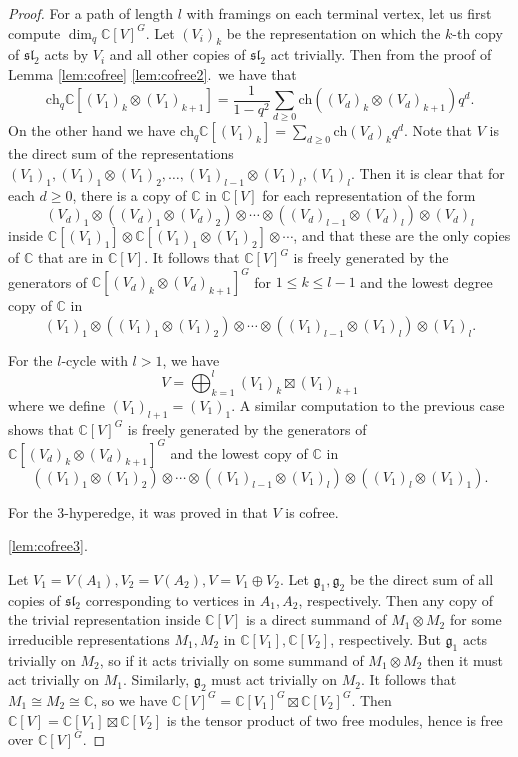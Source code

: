 \documentclass[12pt]{article}
\newcommand{\C}{\mathbb{C}}
\renewcommand{\sl}{\mathfrak{sl}}
\theoremstyle{definition}
\theoremstyle{remark}
\newcommand{\g}{\mathfrak{g}}
\newcommand{\ch}{\mathrm{ch}}
\begin{document}
\begin{proof}
For a path of length $l$ with framings on each terminal vertex, let us first compute $\dim_q\C[V]^G$. Let $(V_i)_k$ be the representation on which the $k$-th copy of $\sl_2$ acts by $V_i$ and all other copies of $\sl_2$ act trivially. Then from the proof of Lemma \ref{lem:cofree} \ref{lem:cofree2}.~we have that
\[\ch_q\C[(V_1)_k\otimes(V_1)_{k+1}]=\frac{1}{1-q^2}\sum_{d\geq 0}\ch((V_d)_k\otimes(V_d)_{k+1})q^d.\]
On the other hand we have $\ch_q\C[(V_1)_k]=\sum_{d\geq 0}\ch(V_d)_kq^d$. Note that $V$ is the direct sum of the representations $(V_1)_1,(V_1)_1\otimes (V_1)_2,\dots,(V_1)_{l-1}\otimes (V_1)_l,(V_1)_l$. Then it is clear that for each $d\geq 0$, there is a copy of $\C$ in $\C[V]$ for each representation of the form
\[(V_d)_1\otimes((V_d)_1\otimes(V_d)_2)\otimes\cdots\otimes((V_d)_{l-1}\otimes (V_d)_l)\otimes (V_d)_l\]
inside $\C[(V_1)_1]\otimes\C[(V_1)_1\otimes (V_1)_2]\otimes\cdots$, and that these are the only copies of $\C$ that are in $\C[V]$. It follows that $\C[V]^G$ is freely generated by the generators of $\C[(V_d)_k\otimes(V_d)_{k+1}]^G$ for $1\leq k\leq l-1$ and the lowest degree copy of $\C$ in
\[(V_1)_1\otimes((V_1)_1\otimes(V_1)_2)\otimes\cdots\otimes((V_1)_{l-1}\otimes (V_1)_l)\otimes (V_1)_l.\]

For the $l$-cycle with $l>1$, we have
\[V=\bigoplus_{k=1}^l(V_1)_k\boxtimes(V_1)_{k+1}\]
where we define $(V_1)_{l+1}=(V_1)_1$. A similar computation to the previous case shows that $\C[V]^G$ is freely generated by the generators of $\C[(V_d)_k\otimes(V_d)_{k+1}]^G$ and the lowest copy of $\C$ in
\[((V_1)_1\otimes(V_1)_2)\otimes\cdots\otimes((V_1)_{l-1}\otimes (V_1)_l)\otimes((V_1)_l\otimes(V_1)_1).\]

For the $3$-hyperedge, it was proved in \cite{littelmann} that $V$ is cofree.

\ref{lem:cofree3}.

Let $V_1=V(A_1),V_2=V(A_2),V=V_1\oplus V_2$. Let $\g_1,\g_2$ be the direct sum of all copies of $\sl_2$ corresponding to vertices in $A_1,A_2$, respectively. Then any copy of the trivial representation inside $\C[V]$ is a direct summand of $M_1\otimes M_2$ for some irreducible representations $M_1,M_2$ in $\C[V_1],\C[V_2]$, respectively. But $\g_1$ acts trivially on $M_2$, so if it acts trivially on some summand of $M_1\otimes M_2$ then it must act trivially on $M_1$. Similarly, $\g_2$ must act trivially on $M_2$. It follows that $M_1\cong M_2\cong\C$, so we have $\C[V]^G=\C[V_1]^G\boxtimes\C[V_2]^G$. Then $\C[V]=\C[V_1]\boxtimes\C[V_2]$ is the tensor product of two free modules, hence is free over $\C[V]^G$.
\end{proof}
\end{document}
